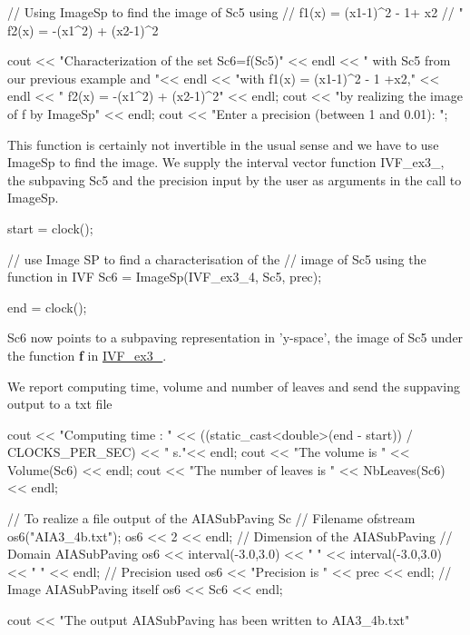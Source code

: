 \begin{DoxyCodeInclude}
  // Using ImageSp to find the image of Sc5 using
  //  f1(x) = (x1-1)^2 - 1+ x2
  // "    f2(x) = -(x1^2) + (x2-1)^2

  cout << "Characterization of the set Sc6=f(Sc5)" << endl
    << " with Sc5 from our previous example and "<< endl
    << "with f1(x) = (x1-1)^2 - 1 +x2," << endl
    << "     f2(x) = -(x1^2) + (x2-1)^2" << endl;
  cout << "by realizing the image of f by ImageSp" << endl;
  cout << "Enter a precision (between 1 and 0.01): ";

\end{DoxyCodeInclude}


\-This function is certainly not invertible in the usual sense and we have to use \-Image\-Sp to find the image. \-We supply the interval vector function \-I\-V\-F\-\_\-ex3\-\_, the subpaving \-Sc5 and the precision input by the user as arguments in the call to \-Image\-Sp.


\begin{DoxyCodeInclude}
  start = clock();

  // use Image SP to find a characterisation of the 
  // image of Sc5 using the function in IVF
  Sc6 = ImageSp(IVF_ex3_4, Sc5, prec);

  end = clock();

\end{DoxyCodeInclude}


\-Sc6 now points to a subpaving representation in 'y-\/space', the image of \-Sc5 under the function {\bfseries f} in \hyperlink{AIASubPavings_IVF_ex3_4}{\-I\-V\-F\-\_\-ex3\-\_}.

\-We report computing time, volume and number of leaves and send the suppaving output to a txt file


\begin{DoxyCodeInclude}
  cout << "Computing time : " 
      << ((static_cast<double>(end - start)) / CLOCKS_PER_SEC) << " s."<< endl;
  cout << "The volume is " << Volume(Sc6) << endl;
  cout << "The number of leaves is " << NbLeaves(Sc6) << endl;

  // To realize a file output of the AIASubPaving Sc
                    // Filename
  ofstream os6("AIA3_4b.txt");
  os6 << 2 << endl; // Dimension of the AIASubPaving
                    // Domain AIASubPaving
  os6 << interval(-3.0,3.0) << " "
    << interval(-3.0,3.0) << " " << endl;
                    // Precision used
  os6 << "Precision is " << prec << endl;
                    // Image AIASubPaving itself
  os6 << Sc6 << endl;

  cout << "The output AIASubPaving has been written to AIA3_4b.txt" 

\end{DoxyCodeInclude}


